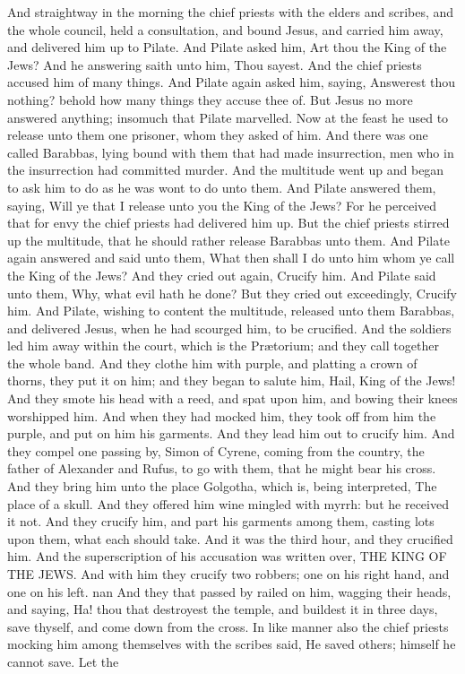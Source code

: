And straightway in the morning the chief priests with the elders and scribes, and the whole council, held a consultation, and bound Jesus, and carried him away, and delivered him up to Pilate. And Pilate asked him, Art thou the King of the Jews? And he answering saith unto him, Thou sayest. And the chief priests accused him of many things. And Pilate again asked him, saying, Answerest thou nothing? behold how many things they accuse thee of. But Jesus no more answered anything; insomuch that Pilate marvelled.  Now at the feast he used to release unto them one prisoner, whom they asked of him. And there was one called Barabbas, lying bound with them that had made insurrection, men who in the insurrection had committed murder. And the multitude went up and began to ask him to do as he was wont to do unto them. And Pilate answered them, saying, Will ye that I release unto you the King of the Jews? For he perceived that for envy the chief priests had delivered him up. But the chief priests stirred up the multitude, that he should rather release Barabbas unto them. And Pilate again answered and said unto them, What then shall I do unto him whom ye call the King of the Jews? And they cried out again, Crucify him. And Pilate said unto them, Why, what evil hath he done? But they cried out exceedingly, Crucify him. And Pilate, wishing to content the multitude, released unto them Barabbas, and delivered Jesus, when he had scourged him, to be crucified.  And the soldiers led him away within the court, which is the Prætorium; and they call together the whole band. And they clothe him with purple, and platting a crown of thorns, they put it on him; and they began to salute him, Hail, King of the Jews! And they smote his head with a reed, and spat upon him, and bowing their knees worshipped him. And when they had mocked him, they took off from him the purple, and put on him his garments. And they lead him out to crucify him.  And they compel one passing by, Simon of Cyrene, coming from the country, the father of Alexander and Rufus, to go with them, that he might bear his cross.  And they bring him unto the place Golgotha, which is, being interpreted, The place of a skull. And they offered him wine mingled with myrrh: but he received it not. And they crucify him, and part his garments among them, casting lots upon them, what each should take. And it was the third hour, and they crucified him. And the superscription of his accusation was written over, THE KING OF THE JEWS. And with him they crucify two robbers; one on his right hand, and one on his left. nan And they that passed by railed on him, wagging their heads, and saying, Ha! thou that destroyest the temple, and buildest it in three days, save thyself, and come down from the cross. In like manner also the chief priests mocking him among themselves with the scribes said, He saved others; himself he cannot save. Let the 